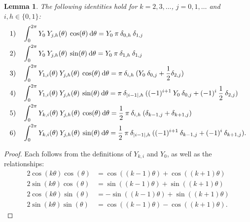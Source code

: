 \documentclass[11pt, oneside]{article}   	%
\newcommand{\half}{\frac{1}{2}}
\newcommand{\ch}{Y}
\newcommand{\chki}{\ch_{k,i}}
\newcommand{\chjh}{\ch_{j,h}}
\newtheorem{lemma}{Lemma}
\begin{document}
\begin{lemma}\label{lemma:Yrecurrence} 
The following identities hold for $k = 2,3,\dots$, $j = 0,1,\dots$ and $i, h \in \{0,1\}$:
\begin{align*}
	&1) \quad \int_0^{2\pi} \ch_0 \: \chjh(\theta) \: \cos(\theta) \: \D \theta = \ch_0 \: \pi \: \delta_{0,h} \: \delta_{1,j} \\
	&2) \quad \int_0^{2\pi} \ch_0 \: \chjh(\theta) \: \sin(\theta) \: \D \theta = \ch_0 \: \pi \: \delta_{1,h} \: \delta_{1,j} \\
	&3) \quad \int_0^{2\pi} \ch_{1,i}(\theta) \: \chjh(\theta) \: \cos(\theta) \: \D \theta = \pi \: \delta_{i,h} \: (\ch_0 \: \delta_{0,j} + \half \delta_{2,j}) \\
	&4) \quad \int_0^{2\pi} \ch_{1,i}(\theta) \: \chjh(\theta) \: \sin(\theta) \: \D \theta = \pi \:  \delta_{|i-1|,h} \: ((-1)^{i+1} \: \ch_0 \: \delta_{0,j} + (-1)^i \: \half \: \delta_{2,j}) \\
	&5) \quad \int_0^{2\pi} \chki(\theta) \: \chjh(\theta) \: \cos(\theta) \: \D \theta = \half \: \pi \: \delta_{i,h} \: (\delta_{k-1,j} + \delta_{k+1,j}) \\
	&6) \quad \int_0^{2\pi} \chki(\theta) \: \chjh(\theta) \: \sin(\theta) \: \D \theta = \half \: \pi \: \delta_{|i-1|,h} \: ((-1)^{i+1} \: \delta_{k-1,j} + (-1)^i \: \delta_{k+1,j}).
\end{align*}
\end{lemma}
\begin{proof}
Each follows from the definitions of $\ch_{k,i}$ and $\ch_0$, as well as the relationships:
\begin{align*}
	2 \cos(k \theta) \cos(\theta) &= \cos((k-1)\theta) + \cos((k+1)\theta) \\
	2 \sin(k \theta) \cos(\theta) &= \sin((k-1)\theta) + \sin((k+1)\theta) \\
	2 \cos(k \theta) \sin(\theta) &= - \sin((k-1)\theta) + \sin((k+1)\theta) \\
	2 \sin(k \theta) \sin(\theta) &= \cos((k-1)\theta) - \cos((k+1)\theta).
\end{align*}
\end{proof}
\end{document}
